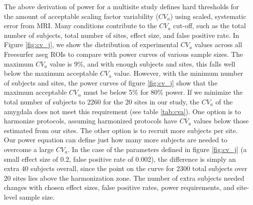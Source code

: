 The above derivation of power for a multisite study defines hard thresholds for the amount of acceptable scaling factor variability ($CV_{a}$) using scaled, systematic error from MRI. Many conditions contribute to the $CV_{a}$ cut-off, such as the total number of subjects, total number of sites, effect size, and false positive rate. In Figure \ref{fig:cv_j}, we show the distribution of experimental $CV_{a}$ values across all Freesurfer aseg ROIs to compare with power curves of various sample sizes. The maximum $CV_{a}$ value is 9\%, and with enough subjects and sites, this falls well below the maximum acceptable $CV_{a}$ value. However, with the minimum number of subjects and sites, the power curves of figure \ref{fig:cv_j} show that the maximum acceptable $CV_{\alpha}$ must be below 5\% for 80\% power. If we minimize the total number of subjects to 2260 for the 20 sites in our study, the $CV_{a}$ of the amygdala does not meet this requirement (see table \ref{tab:cva}). One option is to harmonize protocols, assuming harmonized protocols have $CV_a$ values below those estimated from our sites. The other option is to recruit more subjects per site. Our power equation can define just how many more subjects are needed to overcome a large $CV_a$. In the case of the parameters defined in figure \ref{fig:cv_j} (a small effect size of 0.2, false positive rate of 0.002), the difference is simply an extra 40 subjects overall, since the point on the curve for 2300 total subjects over 20 sites lies above the harmonization zone. The number of extra subjects needed changes with chosen effect sizes, false positive rates, power requirements, and site-level sample size. 

